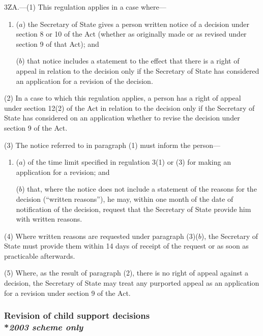 \documentclass[12pt,a4paper]{article}
\begin{document}
3ZA.---(1)  This regulation applies in a case where—
\begin{enumerate}\item[]
($a$) the Secretary of State gives a person written notice of a decision under section 8 or 10 of the Act (whether as originally made or as revised under section 9 of that Act); and

($b$) that notice includes a statement to the effect that there is a right of appeal in relation to the decision only if the Secretary of State has considered an application for a revision of the decision.
\end{enumerate}

(2) In a case to which this regulation applies, a person has a right of appeal under section 12(2) of the Act in relation to the decision only if the Secretary of State has considered on an application whether to revise the decision under section 9 of the Act.

(3) The notice referred to in paragraph (1) must inform the person—
\begin{enumerate}\item[]
($a$) of the time limit specified in regulation 3(1) or (3) for making an application for a revision; and

($b$) that, where the notice does not include a statement of the reasons for the decision (“written reasons”), he may, within one month of the date of notification of the decision, request that the Secretary of State provide him with written reasons.
\end{enumerate}

(4) Where written reasons are requested under paragraph (3)($b$), the Secretary of State must provide them within 14 days of receipt of the request or as soon as practicable afterwards.

(5) Where, as the result of paragraph (2), there is no right of appeal against a decision, the Secretary of State may treat any purported appeal as an application for a revision under section 9 of the Act.


\subsubsection[3A. Revision of child support decisions]{Revision of child support decisions\\*\emph{2003 scheme only}}
\end{document}
